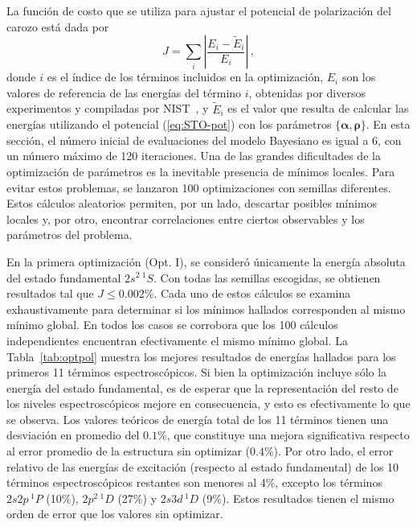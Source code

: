 La función de costo que se utiliza para ajustar el potencial de 
polarización del carozo está dada por 
\begin{equation}
J=\sum_{i} \left|\frac{E_{i}-\tilde{E}_{i}}{E_{i}} \right|\,,
\label{eq:Jpol}
\end{equation}
donde $i$ es el índice de los términos incluidos en la optimización, 
$E_{i}$ son los valores de referencia de las energías del término $i$, 
obtenidas por diversos experimentos y compiladas por NIST~\cite{NIST}, y 
$\tilde{E}_{i}$ es el valor que resulta de calcular las energías 
utilizando el potencial (\ref{eq:STO-pot}) con los parámetros 
$\{\boldsymbol\alpha,\boldsymbol\rho\}$.
En esta sección, el número inicial de evaluaciones del modelo Bayesiano 
es igual a 6, con un número máximo de 120 iteraciones. Una de las 
grandes dificultades de la optimización de parámetros es la inevitable 
presencia de mínimos locales. Para evitar estos problemas, se lanzaron 
100 optimizaciones con semillas diferentes. Estos cálculos aleatorios
permiten, por un lado, descartar posibles mínimos locales y, por otro, 
encontrar correlaciones entre ciertos observables y los parámetros del 
problema. 

En la primera optimización (Opt. I), se consideró únicamente la energía
absoluta del estado fundamental $2s^2\,^1S$. Con todas las semillas 
escogidas, se obtienen resultados tal que $J\leq 0.002\%$. Cada uno de
estos cálculos se examina exhaustivamente para determinar si los mínimos 
hallados corresponden al mismo mínimo global. En todos los casos se 
corrobora que los 100 cálculos independientes encuentran efectivamente 
el mismo mínimo global. La Tabla~\ref{tab:optpol} muestra los mejores 
resultados de energías 
hallados para los primeros 11 términos espectroscópicos. Si bien la 
optimización incluye sólo la energía del estado fundamental, es de 
esperar que la representación del resto de los niveles espectroscópicos 
mejore en consecuencia, y esto es efectivamente lo que se observa. Los 
valores teóricos de energía total de los 11 términos tienen una 
desviación en promedio del $0.1\%$, que constituye una mejora 
significativa respecto al error promedio de la estructura sin optimizar
($0.4\%$). Por otro lado, el error relativo de las energías de 
excitación (respecto al estado fundamental) de los 10 términos 
espectroscópicos restantes son menores al 4\%, excepto los términos 
$2s2p\,^1\!P$ (10\%), $2p^2\,^1\!D$ (27\%) y $2s3d\,^1\!D$ (9\%). Estos 
resultados tienen el mismo orden de error que los valores sin optimizar.

